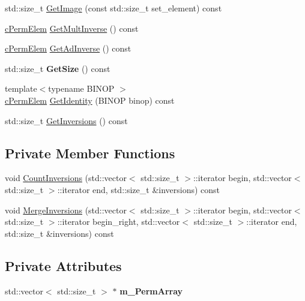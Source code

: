\begin{DoxyCompactItemize}
\item 
std\-::size\-\_\-t \hyperlink{classcPermElem_adad3b042383cf3538bfec790188987c3}{\-Get\-Image} (const std\-::size\-\_\-t set\-\_\-element) const 
\item 
\hyperlink{classcPermElem}{c\-Perm\-Elem} \hyperlink{classcPermElem_adbb23b8a368e0d01cd2b450ad0be5efb}{\-Get\-Mult\-Inverse} () const 
\item 
\hyperlink{classcPermElem}{c\-Perm\-Elem} \hyperlink{classcPermElem_a11cc987f70282d2984c04c6e058c41e8}{\-Get\-Ad\-Inverse} () const 
\item 
\hypertarget{classcPermElem_a773fc9acee08d4c86d391439574eaf3e}{std\-::size\-\_\-t {\bfseries \-Get\-Size} () const }\label{classcPermElem_a773fc9acee08d4c86d391439574eaf3e}

\item 
{\footnotesize template$<$typename B\-I\-N\-O\-P $>$ }\\\hyperlink{classcPermElem}{c\-Perm\-Elem} \hyperlink{classcPermElem_a7f5392e3279b766d5f85c01d363c2941}{\-Get\-Identity} (\-B\-I\-N\-O\-P binop) const 
\item 
std\-::size\-\_\-t \hyperlink{classcPermElem_a06f75de000ad4b9524116a029800ca26}{\-Get\-Inversions} () const 
\end{DoxyCompactItemize}
\subsection*{\-Private \-Member \-Functions}
\begin{DoxyCompactItemize}
\item 
void \hyperlink{classcPermElem_abefedad75d8175a886b30a6d36a0eb98}{\-Count\-Inversions} (std\-::vector$<$ std\-::size\-\_\-t $>$\-::iterator begin, std\-::vector$<$ std\-::size\-\_\-t $>$\-::iterator end, std\-::size\-\_\-t \&inversions) const 
\item 
void \hyperlink{classcPermElem_aa39ae9f1b4d3efd38616ff822caebbb9}{\-Merge\-Inversions} (std\-::vector$<$ std\-::size\-\_\-t $>$\-::iterator begin, std\-::vector$<$ std\-::size\-\_\-t $>$\-::iterator begin\-\_\-right, std\-::vector$<$ std\-::size\-\_\-t $>$\-::iterator end, std\-::size\-\_\-t \&inversions) const 
\end{DoxyCompactItemize}
\subsection*{\-Private \-Attributes}
\begin{DoxyCompactItemize}
\item 
\hypertarget{classcPermElem_a60fc59bfe827b07c6567a3b7a5a25726}{std\-::vector$<$ std\-::size\-\_\-t $>$ $\ast$ {\bfseries m\-\_\-\-Perm\-Array}}\label{classcPermElem_a60fc59bfe827b07c6567a3b7a5a25726}

\end{DoxyCompactItemize}
